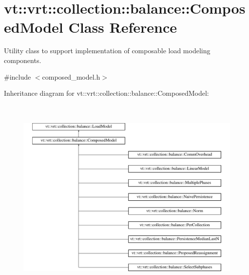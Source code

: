 \hypertarget{classvt_1_1vrt_1_1collection_1_1balance_1_1_composed_model}{}\section{vt\+:\+:vrt\+:\+:collection\+:\+:balance\+:\+:Composed\+Model Class Reference}
\label{classvt_1_1vrt_1_1collection_1_1balance_1_1_composed_model}


Utility class to support implementation of composable load modeling components.  




{\ttfamily \#include $<$composed\+\_\+model.\+h$>$}

Inheritance diagram for vt\+:\+:vrt\+:\+:collection\+:\+:balance\+:\+:Composed\+Model\+:\begin{figure}[H]
\begin{center}
\leavevmode
\includegraphics[height=10.000000cm]{classvt_1_1vrt_1_1collection_1_1balance_1_1_composed_model}
\end{center}
\end{figure}
